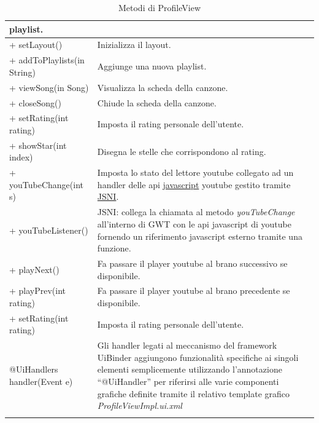 \begin{longtable}{|p{}|p{}|}
playlist.\\\hline 
+ setLayout() & Inizializza il layout.\\\hline
+ addToPlaylists(in String) & Aggiunge una nuova playlist.\\\hline 
+ viewSong(in Song) & Visualizza la scheda della canzone.\\\hline
+ closeSong() & Chiude la scheda della canzone.\\\hline
+ setRating(int rating) & Imposta il rating personale dell'utente.\\\hline
+ showStar(int index) & Disegna le stelle che corrispondono al rating.\\\hline
+ youTubeChange(int s) & Imposta lo stato del lettore youtube collegato
ad un handler delle api \underline{javascript} youtube gestito tramite
\underline{JSNI}.\\\hline + youTubeListener() & JSNI: collega la chiamata al
metodo \emph{youTubeChange} all'interno di GWT con le api javascript di
youtube fornendo un riferimento javascript esterno tramite una funzione.\\\hline
+ playNext() & Fa passare il player youtube al brano successivo se
disponibile.\\\hline
+ playPrev(int rating) & Fa passare il player youtube al brano
precedente se disponibile.\\\hline
+ setRating(int rating) & Imposta il rating personale dell'utente.\\\hline
@UiHandlers handler(Event e) & Gli handler legati al meccanismo del framework
UiBinder aggiungono funzionalit\`a specifiche ai singoli elementi
semplicemente utilizzando l'annotazione ``@UiHandler'' per riferirsi alle varie
componenti grafiche definite tramite il relativo template grafico
\emph{ProfileViewImpl.ui.xml}\\\hline
\caption{Metodi di ProfileView}
\end{longtable}

